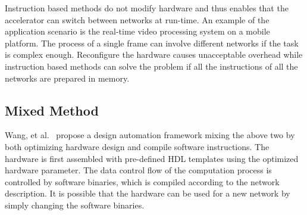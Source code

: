 Instruction based methods do not modify hardware and thus enables that the accelerator can switch between networks at run-time. An example of the application scenario is the real-time video processing system on a mobile platform. The process of a single frame can involve different networks if the task is complex enough. Reconfigure the hardware causes unacceptable overhead while instruction based methods can solve the problem if all the instructions of all the networks are prepared in memory.

\subsection{Mixed Method}
Wang, et al.~\cite{wang2016deepburning} propose a design automation framework mixing the above two by both optimizing hardware design and compile software instructions. The hardware is first assembled with pre-defined HDL templates using the optimized hardware parameter. The data control flow of the computation process is controlled by software binaries, which is compiled according to the network description. It is possible that the hardware can be used for a new network by simply changing the software binaries.

